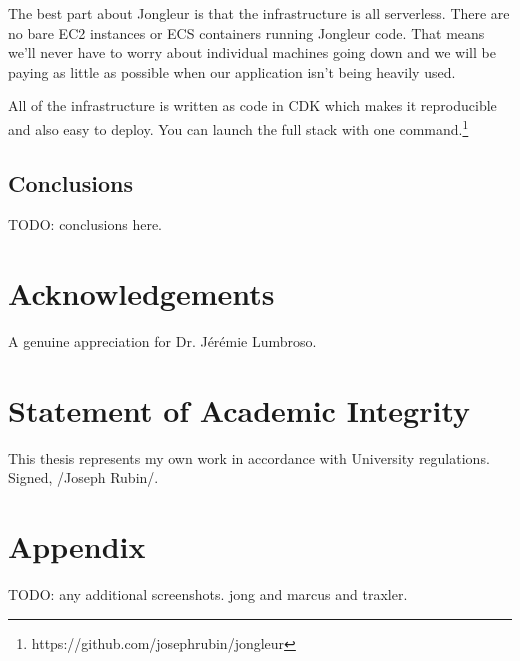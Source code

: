 \documentclass{article}
\begin{document}
The best part about Jongleur is that the infrastructure is all serverless.
There are no bare EC2 instances or ECS containers running Jongleur code.
That means we'll never have to worry about individual machines going down and we will be paying as little as possible when our application isn't being heavily used.

All of the infrastructure is written as code in CDK which makes it reproducible and also easy to deploy.
You can launch the full stack with one command.\footnote{https://github.com/josephrubin/jongleur}

\subsection{Conclusions}

TODO: conclusions here.

\section{Acknowledgements}

A genuine appreciation for Dr. Jérémie Lumbroso.

\section*{Statement of Academic Integrity}

This thesis represents my own work in accordance with University regulations.\\
Signed, /Joseph Rubin/.

%





\printindex

\section{Appendix}

TODO: any additional screenshots.
jong and marcus and traxler.
\end{document}
